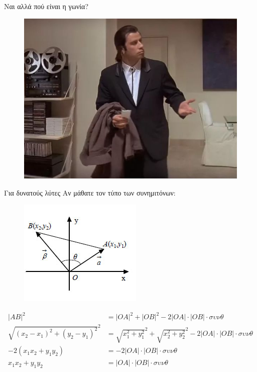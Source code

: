 \documentclass[greek]{beamer}
\begin{document}
\begin{frame}{Ναι αλλά πού είναι η γωνία?}
      \begin{figure}
            \centering
            \includegraphics[width=0.8 \textwidth]{"../images/missing"}
      \end{figure}
\end{frame}

\begin{frame}{Για δυνατούς λύτες}
      Αν μάθατε τον τύπο των συνημιτόνων:
      \begin{figure}
            \centering
            \includegraphics[width=0.35 \textwidth]{"../images/dotproductproof"}
      \end{figure}
      \begin{align*}
            |AB|^2                           & =|OA|^2+|OB|^2-2|OA|\cdot|ΟΒ|\cdot συνθ                             \\
            \sqrt{(x_2-x_1)^2+(y_2-y_1)^2}^2 & =\sqrt{x_1^2+y_1^2}^2+\sqrt{x_2^2+y_2^2}^2-2|OA|\cdot|ΟΒ|\cdot συνθ \\
            -2(x_1x_2+y_1y_2)                & =-2|OA|\cdot|ΟΒ|\cdot συνθ                                          \\
            x_1x_2+y_1y_2                    & =|OA|\cdot|ΟΒ|\cdot συνθ
      \end{align*}
\end{frame}
\end{document}
